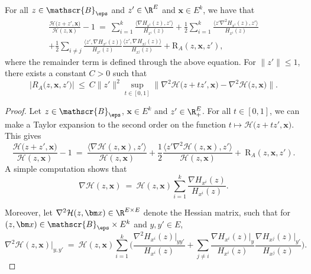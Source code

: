 \begin{refsegment}
\begin{lem}\label{lem:taylor_dvp_A}
For all $z\in \mathscr{B}_{\eps}$ and $z'\in \R^E$ and $\bm x\in E^k$, we have that
\begin{multline*}
 \frac{\mathcal{H}\big(z+z',\bm x\big)}{\mathcal{H}(z,\bm x)}- 1 \ =\ \sum_{i=1}^k \frac{\langle \nabla H_{x^i}(z), z'\rangle}{H_{x^i}(z)} + \frac{1}{2}\sum_{i=1}^k \frac{\langle z'\nabla^2 H_{x^i}(z), z'\rangle}{H_{x^i}(z)}
   \\ + \frac{1}{2}\sum_{i \ne j} \frac{\langle z' ,\nabla H_{x^i}(z)\rangle}{H_{x^i}(z)}\frac{\langle z', \nabla H_{x^j}(z) \rangle}{H_{x^j}(z)}
 + \mathrm{R}_A(z,\bm x,  z'),
\end{multline*}
where the remainder term is defined through the above equation.
For $\lVert z'\rVert\leq 1$, there exists a constant $C>0$ such that 
\begin{equation*}
\big|R_A\big(z,\bm x, z'\big)\big|\  \leq\ C\lVert z'\rVert^2 \sup_{t\in [0,1]}\big\lVert\nabla^2\mathcal H\big(z + t z', \bm x\big)-\nabla^2\mathcal H\big(z, \bm x\big)\big\rVert.
\end{equation*}
\end{lem}
\begin{proof}
Let $z\in \mathscr{B}_\eps$, $\bm x\in E^k$ and $z'\in \R_+^E$. 
 For all $t\in [0,1]$, we can make a Taylor expansion to the second order on the function $t\mapsto  \mathcal H\big(z+tz',\bm x\big)$. This gives
\[
 \frac{\mathcal{H}\big( z +z',\bm x\big)}{\mathcal{H}(z,\bm x)}- 1\ =\ \frac{\big\langle \nabla \mathcal{H}( z,\bm x) , z' \big\rangle}{\mathcal{H}(z,\bm x)} + \frac{1}{2}\frac{\big\langle z' \nabla^2\mathcal{H}(z,\bm x), z' \big\rangle}{\mathcal{H}(z,\bm x)}
 +\ \mathrm{R}_A( z, \bm x, z').
\]
A simple computation shows that
\begin{equation*}
  \nabla \mathcal H(z,\bm x)\ =\ \mathcal H(z,\bm x)\sum_{i=1}^k \frac{\nabla H_{x^i}(z)}{H_{x^i}(z)}.
\end{equation*}

Moreover, let $\nabla^2\mathcal{H}(z,\bm x)\in\R^{E\times E}$ denote the Hessian matrix, such that for $(z,\bm x)\in\mathscr{B}_\eps\times E^k$ and $y,y'\in E$, 
\begin{equation*}
\nabla^2\mathcal{H}(z,\bm x)\big|_{y, y'}\ =\ 
  \mathcal H(z,\bm x)\sum_{i=1}^k \Big(\frac{\nabla^2 H_{x^i}(z)\big|_{yy'}}{H_{x^i}(z)}  + \sum_{j\neq i} \frac{\nabla H_{x^i}(z)\big|_y}{H_{x^i}(z)} \frac{\nabla H_{x^j}(z)\big|_{y'}}{H_{x^j}(z)}\Big).
\end{equation*}


\end{proof}
\end{refsegment}
